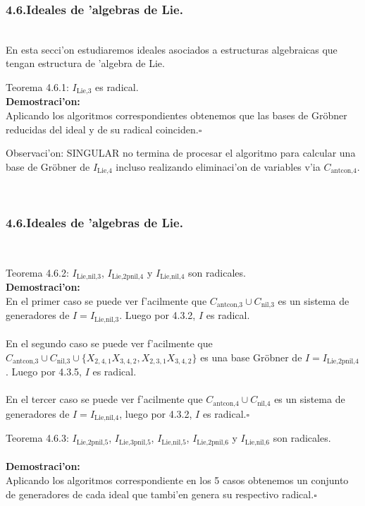 \documentclass[10pt]{beamer}
\begin{document}
\begin{frame}
\frametitle{4.6.Ideales de 'algebras de Lie.}\\
En esta secci'on estudiaremos ideales asociados a estructuras algebraicas que tengan estructura de 'algebra de Lie.\\
\begin{block}{Teorema 4.6.1:}
$I_{\text{Lie,}3}$ es radical.\\
\textbf{Demostraci'on:}\\
Aplicando los algoritmos correspondientes obtenemos que las bases de Gr\"obner reducidas del ideal y de su radical coinciden.\hfill $\square$\\
\end{block}
\begin{block}{Observaci'on:}
SINGULAR no termina de procesar el algoritmo para calcular una base de Gr\"obner de $I_{\text{Lie,}4}$ incluso realizando eliminaci'on de variables v'ia $C_{\text{antcon,}4}$.\\
\end{block}
\vspace{4cm}
\end{frame}
\\
\begin{frame}
\frametitle{4.6.Ideales de 'algebras de Lie.}\\
\begin{block}{Teorema 4.6.2:}
$I_{\text{Lie,nil,}3}$, $I_{\text{Lie,2pnil,}4}$ y $I_{\text{Lie,nil,}4}$ son radicales.\\
\textbf{Demostraci'on:}\\
En el primer caso se puede ver f'acilmente que $C_{\text{antcon,}3}\cup C_{\text{nil,}3}$ es un sistema de generadores de $I=I_{\text{Lie,nil,}3}$. Luego por 4.3.2, $I$ es radical.\\
\\
En el segundo caso se puede ver f'acilmente que\\
$C_{\text{antcon,}3}\cup C_{\text{nil,}3} \cup \{X_{2,4,1}X_{3,4,2},X_{2,3,1}X_{3,4,2}\}$ es una base Gr\"obner de $I=I_{\text{Lie,2pnil,}4}$. Luego por 4.3.5, $I$ es radical.\\
\\
En el tercer caso se puede ver f'acilmente que $C_{\text{antcon,}4}\cup C_{\text{nil,}4}$ es un sistema de generadores de $I=I_{\text{Lie,nil,}4}$, luego por 4.3.2, $I$ es radical.\hfill $\square$\\
\end{block}
\begin{block}{Teorema 4.6.3:}
$I_{\text{Lie,2pnil,}5}$, $I_{\text{Lie,3pnil,}5}$, $I_{\text{Lie,nil,}5}$, $I_{\text{Lie,2pnil,}6}$ y $I_{\text{Lie,nil,}6}$ son radicales.\\
\\
\textbf{Demostraci'on:}\\
Aplicando los algoritmos correspondiente en los 5 casos obtenemos un conjunto de generadores de cada ideal que tambi'en genera su respectivo radical.\hfill $\square$\\
\end{block}
\vspace{5cm}
\end{frame}
\end{document}
